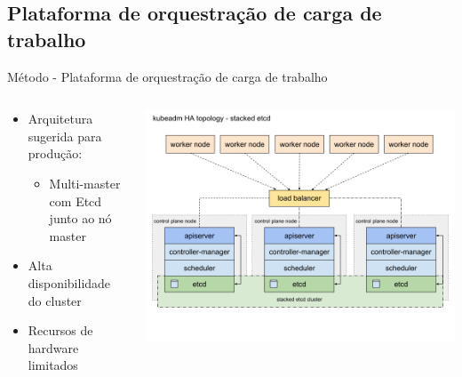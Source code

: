 \documentclass[10pt,brazil]{beamer}
\theoremstyle{definition}
\begin{document}
\subsection{Plataforma de orquestração de carga de trabalho}

\begin{frame}{Método - Plataforma de orquestração de carga de trabalho}
  \begin{columns}
    \begin{column}{0.5\textwidth}
      \begin{itemize}
        \item Arquitetura sugerida para produção:
              \begin{itemize}
                \item Multi-master com Etcd junto ao nó master
              \end{itemize}
        \item Alta disponibilidade do cluster
        \item Recursos de hardware limitados
      \end{itemize}
    \end{column}
    \begin{column}{0.5\textwidth}  %
      \begin{center}
        \includegraphics[width=1\textwidth]{kubeadm-ha-topology-stacked-etcd.png}
      \end{center}
    \end{column}
  \end{columns}
\end{frame}
\end{document}
